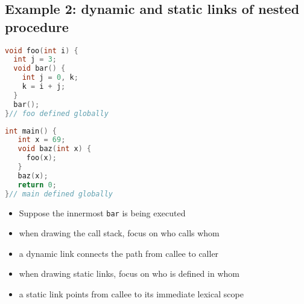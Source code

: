 \documentclass[10pt,a4paper,landscape]{article}
\begin{document}
\begin{multicols*}{3}
\section*{Example 2: dynamic and static links of nested procedure}
\begin{minipage}{.5\linewidth}
\begin{lstlisting}[language=c,xrightmargin=2pt]
void foo(int i) {
  int j = 3;
  void bar() {
    int j = 0, k;
    k = i + j;
  }
  bar();
}// foo defined globally
\end{lstlisting}
\end{minipage}
\begin{minipage}{.5\linewidth}
\begin{lstlisting}[language=c,xleftmargin=2pt]
int main() {
   int x = 69;
   void baz(int x) {
     foo(x);
   }
   baz(x);
   return 0;
}// main defined globally
\end{lstlisting}
\end{minipage}
\begin{itemize}
\item Suppose the innermost \texttt{bar} is being executed
\item when drawing the call stack, focus on who calls whom
\item a dynamic link connects the path from callee to caller
\item when drawing static links, focus on who is defined in whom
\item a static link points from callee to its immediate lexical scope
\end{itemize}
\begin{minipage}{\linewidth}
  \centering
\end{minipage}
\end{multicols*}
\end{document}
